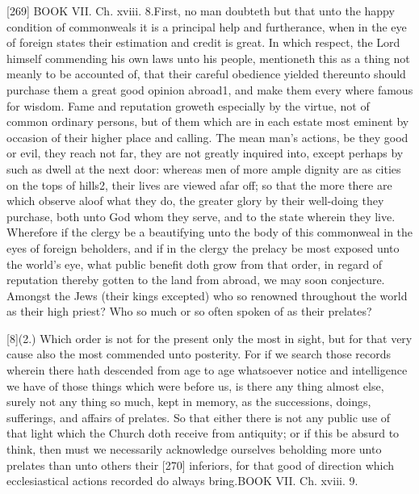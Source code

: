 [269]
BOOK VII. Ch. xviii. 8.First, no man doubteth but that unto the happy condition of commonweals it is a principal help and furtherance, when in the eye of foreign states their estimation and credit is great. In which respect, the Lord himself commending his own laws unto his people, mentioneth this as a thing not meanly to be accounted of, that their careful obedience yielded thereunto should purchase them a great good opinion abroad1, and make them every where famous for wisdom. Fame and reputation groweth especially by the virtue, not of common ordinary persons, but of them which are in each estate most eminent by occasion of their higher place and calling. The mean man’s actions, be they good or evil, they reach not far, they are not greatly inquired into, except perhaps by such as dwell at the next door: whereas men of more ample dignity are as cities on the tops of hills2, their lives are viewed afar off; so that the more there are which observe aloof what they do, the greater glory by their well-doing they purchase, both unto God whom they serve, and to the state wherein they live. Wherefore if the clergy be a beautifying unto the body of this commonweal in the eyes of foreign beholders, and if in the clergy the prelacy be most exposed unto the world’s eye, what public benefit doth grow from that order, in regard of reputation thereby gotten to the land from abroad, we may soon conjecture. Amongst the Jews (their kings excepted) who so renowned throughout the world as their high priest? Who so much or so often spoken of as their prelates?

[8](2.) Which order is not for the present only the most in sight, but for that very cause also the most commended unto posterity. For if we search those records wherein there hath descended from age to age whatsoever notice and intelligence we have of those things which were before us, is there any thing almost else, surely not any thing so much, kept in memory, as the successions, doings, sufferings, and affairs of prelates. So that either there is not any public use of that light which the Church doth receive from antiquity; or if this be absurd to think, then must we necessarily acknowledge ourselves beholding more unto prelates than unto others their [270] inferiors, for that good of direction which ecclesiastical actions recorded do always bring.BOOK VII. Ch. xviii. 9.

